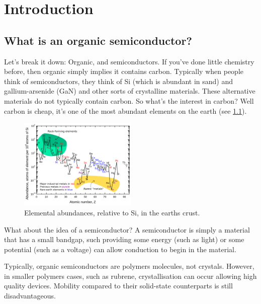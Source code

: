 \documentclass[../main.tex]{subfiles}
\begin{document}
    \chapter{Introduction}\label{chap:01-intro}
		\section{What is an organic semiconductor?}
		Let's break it down: Organic, and semiconductors.
		If you've done little chemistry before, then organic simply implies it contains carbon. Typically when people think of semiconductors, they think of Si (which is abundant in sand) and gallium-arsenide (GaN) and other sorts of crystalline materials. These alternative materials do not typically contain carbon.
		So what's the interest in carbon? Well carbon is cheap, it's one of the most abundant elements on the earth (see \cref{fig:ch1-elemental_abundance}).
		\begin{figure}[H]
			\centering
			\includegraphics[width=0.5\textwidth]{resources/ch1/elemental-abundances}
			\caption{Elemental abundances, relative to Si, in the earths crust.\autocite{haxel_rare_2005}}
			\label{fig:ch1-elemental_abundance}
		\end{figure}
		
		What about the idea of a semiconductor? A semiconductor is simply a material that has a small bandgap, such providing some energy (such as light) or some potential (such as a voltage) can allow conduction to begin in the material.
		
		Typically, organic semiconductors are polymers molecules, not crystals. However, in smaller polymers cases, such as rubrene\autocite{wang_highly_2023}, crystallisation can occur allowing high quality devices. Mobility compared to their solid-state counterparts is still disadvantageous.

\ifSubfilesClassLoaded{
    \printbibliography{}
    \printglossaries
}{} %
    
\end{document}
